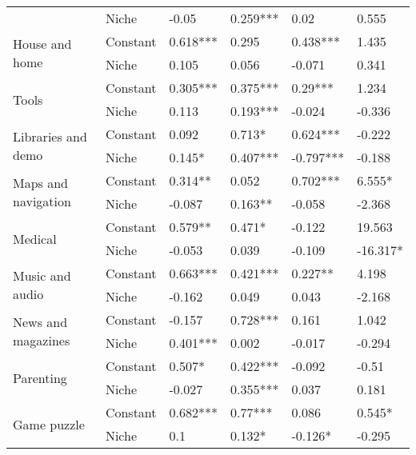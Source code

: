 \begin{longtable}[h!]{llllll}
          & Niche &               -0.05 &    0.259*** &       0.02 &      0.555 \\
\cline{1-6}
\multirow{2}{*}{House and home} & Constant &            0.618*** &       0.295 &   0.438*** &      1.435 \\
          & Niche &               0.105 &       0.056 &     -0.071 &      0.341 \\
\cline{1-6}
\multirow{2}{*}{Tools} & Constant &            0.305*** &    0.375*** &    0.29*** &      1.234 \\
          & Niche &               0.113 &    0.193*** &     -0.024 &     -0.336 \\
\cline{1-6}
\multirow{2}{*}{Libraries and demo} & Constant &               0.092 &      0.713* &   0.624*** &     -0.222 \\
          & Niche &              0.145* &    0.407*** &  -0.797*** &     -0.188 \\
\cline{1-6}
\multirow{2}{*}{Maps and navigation} & Constant &             0.314** &       0.052 &   0.702*** &     6.555* \\
          & Niche &              -0.087 &     0.163** &     -0.058 &     -2.368 \\
\cline{1-6}
\multirow{2}{*}{Medical} & Constant &             0.579** &      0.471* &     -0.122 &     19.563 \\
          & Niche &              -0.053 &       0.039 &     -0.109 &   -16.317* \\
\cline{1-6}
\multirow{2}{*}{Music and audio} & Constant &            0.663*** &    0.421*** &    0.227** &      4.198 \\
          & Niche &              -0.162 &       0.049 &      0.043 &     -2.168 \\
\cline{1-6}
\multirow{2}{*}{News and magazines} & Constant &              -0.157 &    0.728*** &      0.161 &      1.042 \\
          & Niche &            0.401*** &       0.002 &     -0.017 &     -0.294 \\
\cline{1-6}
\multirow{2}{*}{Parenting} & Constant &              0.507* &    0.422*** &     -0.092 &      -0.51 \\
          & Niche &              -0.027 &    0.355*** &      0.037 &      0.181 \\
\cline{1-6}
\multirow{2}{*}{Game puzzle} & Constant &            0.682*** &     0.77*** &      0.086 &     0.545* \\
          & Niche &                 0.1 &      0.132* &    -0.126* &     -0.295 \\

\end{longtable}

